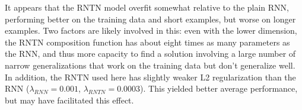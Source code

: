 It appears that the RNTN model overfit somewhat relative to the plain RNN,
performing better on the training data and short examples, but worse on longer
examples. Two factors are likely involved in this: even with the lower dimension,
the RNTN composition function has about eight times as many parameters as the
RNN, and thus more capacity to find a solution involving a large number of narrow 
generalizations that work on the training data but don't generalize well. In addition,
the RNTN used here has slightly weaker L2 regularization than the 
RNN ($\lambda_{\textit{RNN}} = 0.001$, $\lambda_{\textit{RNTN}} = 0.0003$). This
yielded better average performance, but may have facilitated this effect.





